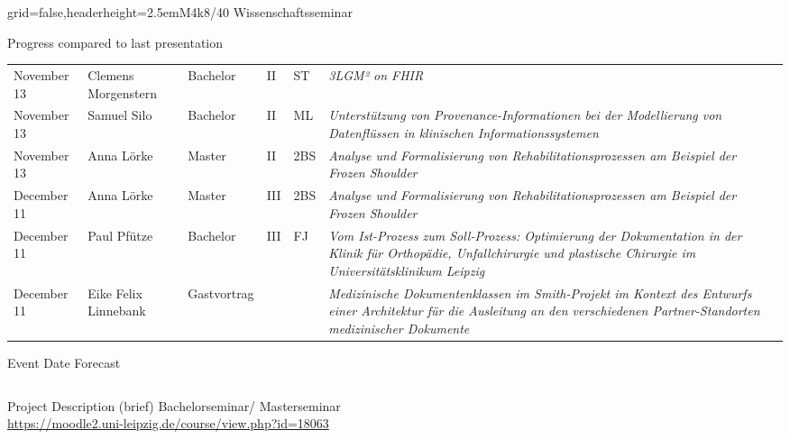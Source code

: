 \documentclass[english]{kiesgrube}
\begin{document}
\begin{poster}{grid=false,headerheight=2.5em}{}{M4k8/40 Wissenschaftsseminar}{}{}
\begin{posterbox}[name=progress,below=person,span=2]{Progress compared to last presentation}
\begin{tabulary}{\textwidth}{lllllL}
November 13	&Clemens Morgenstern		&Bachelor	&II		&ST	&\emph{3LGM² on FHIR}\\
November 13	&Samuel Silo			&Bachelor	&II		&ML	&\emph{Unterstützung von Provenance-Informationen bei der Modellierung von Datenflüssen in klinischen Informationssystemen}\\
November 13	&Anna Lörke			&Master		&II		&2BS	&\emph{Analyse und Formalisierung von Rehabilitationsprozessen am Beispiel der Frozen Shoulder}\\
December 11	&Anna Lörke			&Master		&III		&2BS	&\emph{Analyse und Formalisierung von Rehabilitationsprozessen am Beispiel der Frozen Shoulder}\\
December 11	&Paul Pfütze			&Bachelor	&III		&FJ	&\emph{Vom Ist-Prozess zum Soll-Prozess: Optimierung der Dokumentation in der Klinik für Orthopädie, Unfallchirurgie und plastische Chirurgie im Universitätsklinikum Leipzig}\\
December 11	&Eike Felix Linnebank	&Gastvortrag	&	&	&\emph{Medizinische Dokumentenklassen im Smith-Projekt im Kontext des Entwurfs einer Architektur für die Ausleitung an den verschiedenen Partner-Standorten medizinischer Dokumente}\\
\end{tabulary}
\end{posterbox}
\begin{posterbox}[name=event,below=progress,span=2]{Event Date Forecast}
\footnotesize
\begin{tabulary}{\textwidth}{lllllL}
\end{tabulary}
\end{posterbox}
\begin{posterbox}[name=description,column=1,row=0]{Project Description (brief)}
Bachelorseminar/ Masterseminar\\
\footnotesize
\url{https://moodle2.uni-leipzig.de/course/view.php?id=18063}\\

\end{posterbox}
\end{poster}
\end{document}
